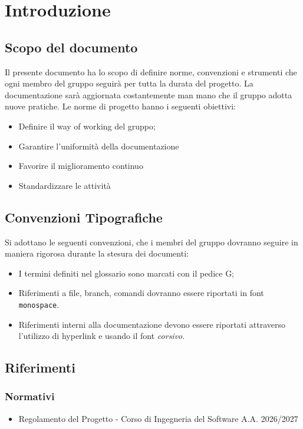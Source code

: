 \section{Introduzione}
\subsection{Scopo del documento}
Il presente documento ha lo scopo di definire norme, convenzioni e strumenti che ogni membro del gruppo \textbf{\nomegruppo} seguirà per tutta la durata del progetto. La documentazione sarà aggiornata costantemente man mano che il gruppo adotta nuove pratiche. 
Le norme di progetto hanno i seguenti obiettivi:
\begin{itemize}
	\item Definire il way of working del gruppo;
	\item Garantire l'uniformità della documentazione
	\item Favorire il miglioramento continuo
	\item Standardizzare le attività
\end{itemize}

\subsection{Convenzioni Tipografiche}
Si adottano le seguenti convenzioni, che i membri del gruppo dovranno seguire in maniera rigorosa durante la stesura dei documenti:
\begin{itemize}
	\item I termini definiti nel glossario sono marcati con il pedice G;
	\item Riferimenti a file, branch, comandi dovranno essere riportati in font \texttt{monospace}.
	\item Riferimenti interni alla documentazione devono essere riportati attraverso l'utilizzo di hyperlink e usando il font \textit{corsivo}.
\end{itemize}

\subsection{Riferimenti}
\subsubsection{Normativi}
\begin{itemize}
		\item Regolamento del Progetto - Corso di Ingegneria del Software A.A. 2026/2027
\end{itemize}


